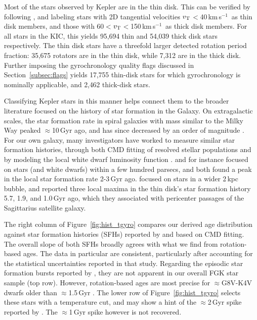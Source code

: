 \documentclass[11pt,twocolumn,tighten]{aastex63}
\newcommand{\kms}{{km\,s$^{-1}$}}
\begin{document}
Most of the stars observed by Kepler are in the thin disk.  This can
be verified by following \citet{Gaia_2018}, and labeling stars with 2D
tangential velocities $v_{\rm T}$$<$40\,\kms\ as thin disk members,
and those with 60$<$$v_{\rm T}$$<$150\,\kms\ as thick disk members.
For all stars in the KIC, this yields 95{,}694 thin and 54{,}039 thick
disk stars respectively.  The thin disk stars have a threefold larger
detected rotation period fraction: 35{,}675 rotators are in the thin
disk, while 7{,}312 are in the thick disk.  Further imposing the
gyrochronology quality flags discussed in Section~\ref{subsec:flags}
yields 17{,}755 thin-disk stars for which gyrochronology is nominally
applicable, and 2{,}462 thick-disk stars.

Classifying Kepler stars in this manner helps connect them to the
broader literature focused on the history of star formation in the
Galaxy.  On extragalactic scales, the star formation rate in spiral
galaxies with mass similar to the Milky Way peaked $\approx$10\,Gyr
ago, and has since decreased by an order of magnitude
\citep[e.g.][]{2004Natur.428..625H,2006ApJ...651..142H}.  For our own
galaxy, many investigators have worked to measure similar star
formation histories, through both CMD fitting of resolved stellar
populations
\citep[][]{2019A&A...624L...1M,2020NatAs...4..965R,2021MNRAS.501..302A,2022Natur.603..599X}
and by modeling the local white dwarf luminosity function
\citep[e.g.][]{2019ApJ...878L..11I}.  \citet{2019A&A...624L...1M} and
\citet{2019ApJ...878L..11I} for instance focused on stars (and white
dwarfs) within a few hundred parsecs, and both found a peak in the
local star formation rate 2-3\,Gyr ago.  \citet{2020NatAs...4..965R}
focused on stars in a wider 2\,kpc bubble, and reported three local
maxima in the thin disk's star formation history 5.7, 1.9, and
1.0\,Gyr ago, which they associated with pericenter passages of the
Sagittarius satellite galaxy.

The right column of Figure~\ref{fig:hist_tgyro} compares our derived
age distribution against star formation histories (SFHs) reported by
\citet{2019A&A...624L...1M} and \citet{2020NatAs...4..965R} based on
CMD fitting.  The overall slope of both SFHs broadly agrees with what
we find from rotation-based ages.  The \citet{2019A&A...624L...1M}
data in particular are consistent, particularly after accounting for the
statistical uncertainties reported in that study.  Regarding the
episodic star formation bursts reported by
\citet{2020NatAs...4..965R}, they are not apparent in our overall FGK
star sample (top row).  However, rotation-based ages are most precise
for $\approx$G8V-K4V dwarfs older than $\approx$1.5\,Gyr
\citep{Bouma_2023}.  The lower row of Figure~\ref{fig:hist_tgyro}
selects these stars with a temperature cut, and may show a hint of the
$\approx$2\,Gyr spike reported by \citet{2020NatAs...4..965R}.  The
$\approx$1\,Gyr spike however is not recovered.
\end{document}

